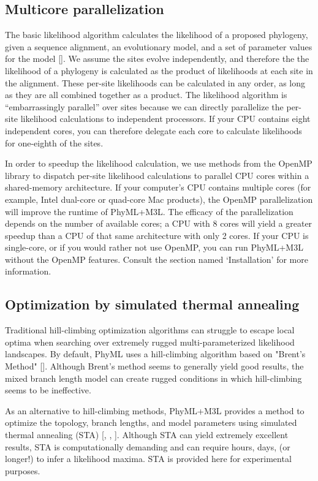 \documentclass[11pt]{article}
\begin{document}
\subsection{Multicore parallelization}

The basic likelihood algorithm calculates the likelihood of a proposed phylogeny, given a sequence alignment, an evolutionary model, and a set of parameter values for the model [\cite{felsenstein1981}].  We assume the sites evolve independently, and therefore the the likelihood of a phylogeny is calculated as the product of likelihoods at each site in the alignment. These per-site likelihoods can be calculated in any order, as long as they are all combined together as a product.  The likelihood algorithm is ``embarrassingly parallel'' over sites because we can directly parallelize the per-site likelihood calculations to independent processors. If your CPU contains eight independent cores, you can therefore delegate each core to calculate likelihoods for one-eighth of the sites.

In order to speedup the likelihood calculation, we use methods from the OpenMP library to dispatch per-site likelihood calculations to parallel CPU cores within a shared-memory architecture. If your computer's CPU contains multiple cores (for example, Intel dual-core or quad-core Mac products), the OpenMP parallelization will improve the runtime of PhyML+M3L. The efficacy of the parallelization depends on the number of available cores; a CPU with 8 cores will yield a greater speedup than a CPU of that same architecture with only 2 cores. If your CPU is single-core, or if you would rather not use OpenMP, you can run PhyML+M3L without the OpenMP features. Consult the section named `Installation' for more information. 

\subsection{Optimization by simulated thermal annealing}

Traditional hill-climbing optimization algorithms can struggle to escape local optima when searching over extremely rugged multi-parameterized likelihood landscapes. By default, PhyML uses a hill-climbing algorithm based on "Brent's Method" [\cite{brent1972}]. Although Brent's method seems to generally yield good results, the mixed branch length model can create rugged conditions in which hill-climbing seems to be ineffective.

As an alternative to hill-climbing methods, PhyML+M3L provides a method to optimize the topology, branch lengths, and model parameters using simulated thermal annealing (STA) [\cite{Kirkpatrick1983}, \cite{kirkpatrick1984}, \cite{kolaczkowski2008}]. Although STA can yield extremely excellent results, STA is computationally demanding and can require hours, days, (or longer!) to infer a likelihood maxima. STA is provided here for experimental purposes. 
\end{document}
